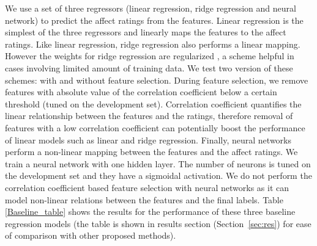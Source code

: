 \documentclass{article}
\begin{document}
\begin{spacing}{0.9}
We use a set of three regressors (linear regression, ridge regression and neural network) to predict the affect ratings from the features. 
Linear regression \cite{bishop2006pattern} is the simplest of the three regressors and linearly maps the features to the affect ratings.
Like linear regression, ridge regression \cite{bishop2006pattern} also performs a linear mapping.
However the weights for ridge regression are regularized \cite{bishop2006pattern}, a scheme helpful in cases involving limited amount of training data.
We test two version of these schemes: with and without feature selection.
During feature selection, we remove features with absolute value of the correlation coefficient below a certain threshold (tuned on the development set).
Correlation coefficient quantifies the linear relationship between the features and the ratings, therefore removal of features with a low correlation coefficient can potentially boost the performance of linear models such as linear and ridge regression. 
Finally, neural networks \cite{bishop2006pattern} perform a non-linear mapping between the features and the affect ratings. 
We train a neural network with one hidden layer.
The number of neurons is tuned on the development set and they have a sigmoidal activation.
We do not perform the correlation coefficient based feature selection with neural networks as it can model non-linear relations between the features and the final labels. 
Table \ref{Baseline_table} shows the results for the performance of these three baseline regression models (the table is shown in results section (Section~\ref{sec:res}) for ease of comparison with other proposed methods). 


\vspace{-2mm}

\end{spacing}
\end{document}
